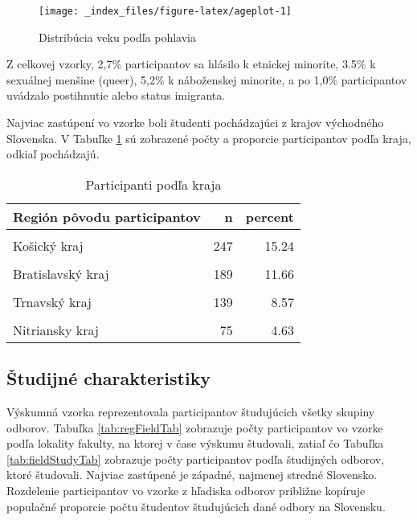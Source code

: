 \documentclass[
]{article}
\begin{document}
\begin{figure}

{\centering \texttt{[image: \_index\_files/figure-latex/ageplot-1]} 

}

\caption{Distribúcia veku podľa pohlavia}\label{fig:ageplot}
\end{figure}

Z celkovej vzorky, 2,7\% participantov sa hlásilo k etnickej minorite, 3.5\% k sexuálnej menšine (queer), 5,2\% k náboženskej minorite, a po 1,0\% participantov uvádzalo postihnutie alebo status imigranta.

Najviac zastúpení vo vzorke boli študenti pochádzajúci z krajov východného Slovenska. V Tabuľke \ref{tab:regionTab} sú zobrazené počty a proporcie participantov podľa kraja, odkiaľ pochádzajú.

\begin{table}[H]

\caption{\label{tab:regionTab}Participanti podľa kraja}
\centering
\fontsize{10}{12}\selectfont
\begin{tabular}[t]{lrr}
\toprule
Región pôvodu participantov & n & percent\\
\midrule
\cellcolor{gray!6}{Prešovský kraj} & \cellcolor{gray!6}{382} & \cellcolor{gray!6}{23.57}\\
Košický kraj & 247 & 15.24\\
\cellcolor{gray!6}{Banskobystrický kraj} & \cellcolor{gray!6}{198} & \cellcolor{gray!6}{12.21}\\
Bratislavský kraj & 189 & 11.66\\
\cellcolor{gray!6}{Žilinský kraj} & \cellcolor{gray!6}{155} & \cellcolor{gray!6}{9.56}\\
\addlinespace
Trnavský kraj & 139 & 8.57\\
\cellcolor{gray!6}{Trenčiansky kraj} & \cellcolor{gray!6}{107} & \cellcolor{gray!6}{6.60}\\
Nitriansky kraj & 75 & 4.63\\
\bottomrule
\end{tabular}
\end{table}

\hypertarget{ux161tudijnuxe9-charakteristiky}{%
\subsection{Študijné charakteristiky}\label{ux161tudijnuxe9-charakteristiky}}

Výskumná vzorka reprezentovala participantov študujúcich všetky skupiny odborov. Tabuľka \ref{tab:regFieldTab} zobrazuje počty participantov vo vzorke podľa lokality fakulty, na ktorej v čase výskumu študovali, zatiaľ čo Tabuľka \ref{tab:fieldStudyTab} zobrazuje počty participantov podľa študijných odborov, ktoré študovali. Najviac zastúpené je západné, najmenej stredné Slovensko. Rozdelenie participantov vo vzorke z hľadiska odborov približne kopíruje populačné proporcie počtu študentov študujúcich dané odbory na Slovensku.
\end{document}
